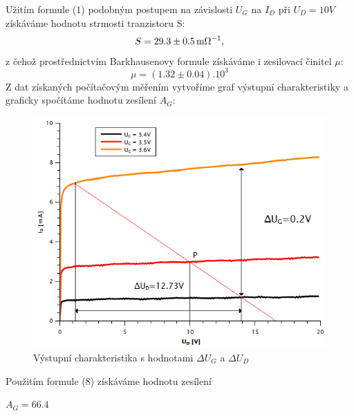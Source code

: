 \documentclass[czech,11pt,a4paper]{article}
\begin{document}
\begin{multicols}{2}
	
	Užitím formule (1) podobným postupem na závislosti $U_G$ na $I_D$ při $U_D = 10V$ získáváme hodnotu strmosti tranzistoru S:
	\begin{equation*}
		S = 29.3 \pm 0.5 \,\rm m\Omega^{-1},
	\end{equation*}
	z čehož prostřednictvím Barkhausenovy formule získáváme i zesilovací činitel $\mu$:
	\begin{equation*}
		\mu = (1.32 \pm 0.04).10^3
	\end{equation*}
	Z dat získaných počítačovým měřením vytvoříme graf výstupní charakteristiky a graficky spočítáme hodnotu zesílení $A_G$:
	\begin{figure}[H]
		\begin{center}			
			\includegraphics[width=0.8\linewidth, ]{comppomer} 
			\caption{Výstupní charakteristika s hodnotami $\Delta U_G$ a $\Delta U_D$}
			\end{center}		
	\end{figure} 
	Použitím formule (8) získáváme hodnotu zesílení\begin{center}
		$	A_G = 66.4$
\end{center}

\end{multicols}
\end{document}
